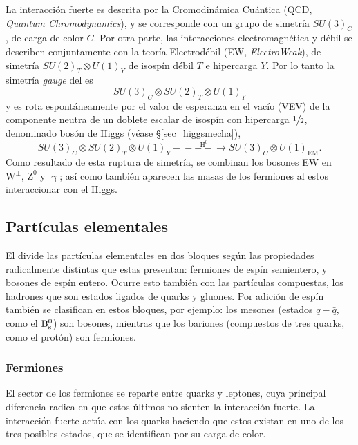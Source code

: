 La interacción fuerte es descrita por la Cromodinámica Cuántica (QCD, \emph{Quantum Chromodynamics}), y se corresponde con un grupo de simetría $SU(3)_{C}$, de carga de color $C$. Por otra parte, las interacciones electromagnética y débil se describen conjuntamente con la teoría Electrodébil (EW, \textit{ElectroWeak}), de simetría $SU(2)_T \otimes U(1)_Y $ de isospín débil $T$ e hipercarga $Y$. Por lo tanto la simetría \emph{gauge} del \stdmod es 
\[SU(3)_{C}\otimes SU(2)_T \otimes U(1)_Y \]
y es rota espontáneamente por el valor de esperanza en el vacío (VEV) de la componente neutra de un doblete escalar de isospín con hipercarga $\sfrac{1}{2}$, denominado bosón de Higgs (véase \S \ref{sec_higgsmecha}),
\begin{equation}
	SU(3)_{C}\otimes SU(2)_T \otimes U(1)_Y -\!\!\!\!-\!\!\!\overset{\mathrm{H^0}}{-\!\!-}\!\!\!\rightarrow SU(3)_C \otimes U(1)_{\text{EM}}.
\end{equation}
Como resultado de esta ruptura de simetría, se combinan los bosones EW en $\mathrm{W^{\pm},\, Z^{0}}$ y $\upgamma$; así como también aparecen las masas de los fermiones al estos interaccionar con el Higgs.




\subsection{Partículas elementales} %

El \stdmod divide las partículas elementales en dos bloques según las propiedades radicalmente distintas que estas presentan: fermiones de espín semientero, y bosones de espín entero. \color{vero} Ocurre esto también con las partículas compuestas,  los hadrones que son estados ligados de quarks y gluones. \color{norm} Por adición de espín también se clasifican en estos bloques, por ejemplo: los mesones (estados $q-\bar{q}$, como el $\mathrm{B}{}_{\mathrm{s}}^{0}$) son bosones, mientras que los bariones (compuestos de tres quarks, como el protón) son fermiones.


\subsubsection{Fermiones} %

El sector de los fermiones se reparte entre quarks y leptones, cuya principal diferencia radica en que estos últimos no sienten la interacción fuerte. 
La interacción fuerte \color{vero} actúa \color{norm} con los quarks haciendo que estos existan en uno de los tres posibles estados, que se identifican por su carga de color.

